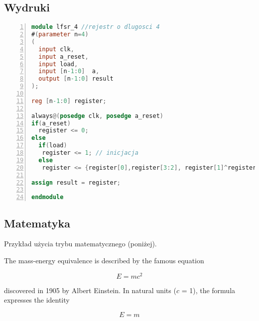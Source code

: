 \subsection{Wydruki}
\begin{lstlisting}[label=lst:wydruk,caption={Testowy program w Verilog},language=Verilog,numbers=left]
module lfsr_4 //rejestr o dlugosci 4
#(parameter n=4)
(
  input clk,
  input a_reset,
  input load,
  input [n-1:0]  a,
  output [n-1:0] result
);

reg [n-1:0] register;

always@(posedge clk, posedge a_reset)
if(a_reset)
  register <= 0;
else 
  if(load)
   register <= 1; // inicjacja
  else
   register <= {register[0],register[3:2], register[1]^register[0]};

assign result = register;

endmodule
\end{lstlisting}

\subsection{Matematyka}
Przykład użycia trybu matematycznego (poniżej).

The mass-energy equivalence is described by the famous equation

$$E=mc^2$$ %

discovered in 1905 by Albert Einstein. 
In natural units ($c$ = 1), the formula expresses the identity %

\begin{equation} %
E=m
\end{equation}

